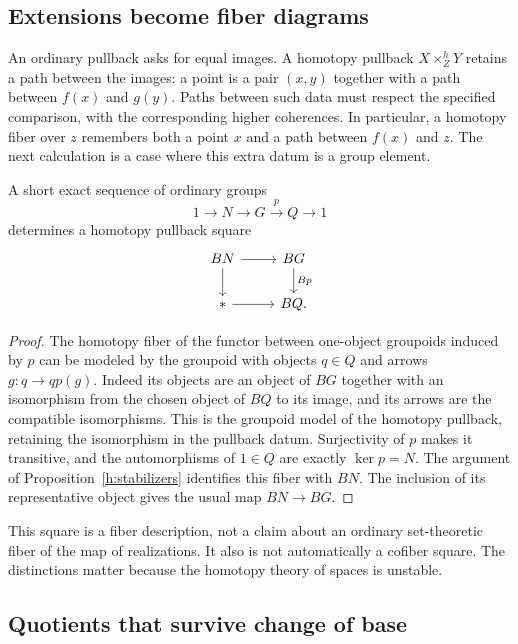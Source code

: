 \subsection{Extensions become fiber diagrams}

An ordinary pullback asks for equal images. A homotopy pullback
$X\times^h_ZY$ retains a path between the images: a point is a pair
$(x,y)$ together with a path between $f(x)$ and $g(y)$.
Paths between such data must respect the specified comparison, with the
corresponding higher coherences. In particular, a homotopy fiber over
$z$ remembers both a point $x$ and a path between $f(x)$ and $z$.
The next calculation is a case where this extra datum is a group element.

\begin{proposition}\label{h:extension-fiber}
A short exact sequence of ordinary groups
\[
 1\longrightarrow N\longrightarrow G\xrightarrow{p}Q\longrightarrow1
\]
determines a homotopy pullback square
\[
\begin{tikzcd}
 BN \arrow[r] \arrow[d] & BG \arrow[d,"Bp"]\\
 * \arrow[r] & BQ.
\end{tikzcd}
\]
\end{proposition}
\begin{proof}
The homotopy fiber of the functor between one-object groupoids induced by
$p$ can be modeled by the groupoid with objects $q\in Q$ and arrows
$g:q\to q p(g)$.  Indeed its objects are an object of $BG$ together with
an isomorphism from the chosen object of $BQ$ to its image, and its arrows
are the compatible isomorphisms.  This is the groupoid model of the
homotopy pullback, retaining the isomorphism in the pullback datum.
Surjectivity of $p$ makes it transitive, and the automorphisms of $1\in Q$
are exactly $\ker p=N$.  The argument of
Proposition~\ref{h:stabilizers} identifies this fiber with $BN$.
The inclusion of its representative object gives the usual map $BN\to BG$.
\end{proof}

This square is a fiber description, not a claim about an ordinary
set-theoretic fiber of the map of realizations.  It also is not automatically
a cofiber square.  The distinctions matter because the homotopy theory
of spaces is unstable.

\subsection{Quotients that survive change of base}

